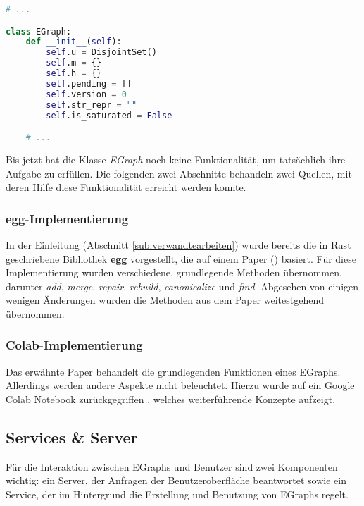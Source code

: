 \begin{lstlisting}[language=Python, caption=Klasse \textit{EGraph}]
# ... 

class EGraph:
    def __init__(self):
        self.u = DisjointSet()
        self.m = {}
        self.h = {}
        self.pending = []
        self.version = 0
        self.str_repr = ""
        self.is_saturated = False

    # ...
\end{lstlisting} 

Bis jetzt hat die Klasse \textit{EGraph} noch keine Funktionalität, um tatsächlich ihre Aufgabe zu erfüllen. Die folgenden zwei Abschnitte 
behandeln zwei Quellen, mit deren Hilfe diese Funktionalität erreicht werden konnte.

\subsubsection{egg-Implementierung}\label{subsub:egg}

In der Einleitung (Abschnitt \ref{sub:verwandtearbeiten}) wurde bereits die in Rust geschriebene Bibliothek \textbf{egg} vorgestellt, die auf einem Paper (\cite{2021-egg}) basiert.
Für diese Implementierung wurden verschiedene, grundlegende Methoden übernommen, darunter \textit{add}, \textit{merge}, \textit{repair}, \textit{rebuild}, \textit{canonicalize} und
\textit{find}. Abgesehen von einigen wenigen Änderungen wurden die Methoden aus dem Paper weitestgehend übernommen.



\subsubsection{Colab-Implementierung}\label{subsub:colab}

Das erwähnte Paper behandelt die grundlegenden Funktionen eines EGraphs. Allerdings werden andere Aspekte nicht beleuchtet. Hierzu wurde auf ein Google Colab Notebook zurückgegriffen \cite{devito},
welches weiterführende Konzepte aufzeigt.







\subsection{Services \& Server}

Für die Interaktion zwischen EGraphs und Benutzer sind zwei Komponenten wichtig: ein Server, der Anfragen der Benutzeroberfläche beantwortet sowie ein Service, der im Hintergrund
die Erstellung und Benutzung von EGraphs regelt.

